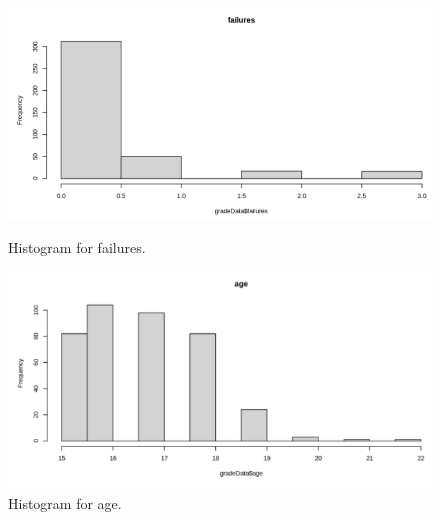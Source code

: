 \documentclass[a4paper]{article}
\begin{document}
\begin{figure}[H]
    \centering
    \begin{minipage}{0.5\textwidth}
        \centering
        \includegraphics[width = 1\linewidth]{Images/19.PNG}
        \caption{Histogram for failures.}
        \label{fig:hist11}
    \end{minipage}%
    \begin{minipage}{0.5\textwidth}
        \centering
        \includegraphics[width = 1\linewidth]{Images/20.PNG}
        \caption{Histogram for age.}
        \label{fig:hist13}
        \end{minipage}
\end{figure}

\end{document}
